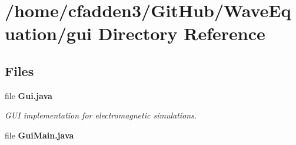 \section{/home/cfadden3/\+Git\+Hub/\+Wave\+Equation/gui Directory Reference}
\label{dir_11bc0974ce736ce9a6fadebbeb7a8314}
\subsection*{Files}
\begin{DoxyCompactItemize}
\item 
file {\bf Gui.\+java}
\begin{DoxyCompactList}\small\item\em G\+U\+I implementation for electromagnetic simulations. \end{DoxyCompactList}\item 
file {\bfseries Gui\+Main.\+java}
\end{DoxyCompactItemize}
